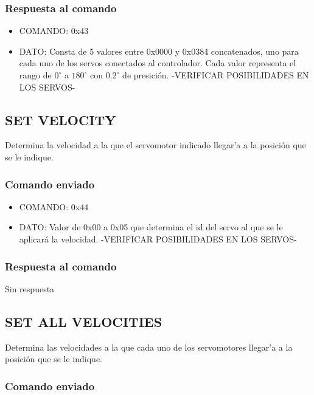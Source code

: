 \documentclass[a4paper,11pt]{article}
\begin{document}
\subsubsection*{Respuesta al comando}
\label{get_all_position_respuesta}

\begin{itemize}
	\item{COMANDO:} 0x43
	\item{DATO:} Consta de 5 valores entre 0x0000 y 0x0384 concatenados, uno para cada uno de los servos conectados al controlador.
	Cada valor representa el rango de $0^{\circ}$ a $180^{\circ}$ con $0.2^{\circ}$ de presici\'on. -VERIFICAR POSIBILIDADES EN LOS SERVOS-
\end{itemize}

\subsection{SET VELOCITY}
\label{set_velocity}

Determina la velocidad a la que el servomotor indicado llegar'a a la posici\'on que se le indique.

\subsubsection*{Comando enviado}
\label{set_velocity_comando_enviado}

\begin{itemize}
	\item{COMANDO:} 0x44
	\item{DATO:} Valor de 0x00 a 0x05 que determina el id del servo al que se le aplicar\'a la velocidad.
	-VERIFICAR POSIBILIDADES EN LOS SERVOS-
\end{itemize}

\subsubsection*{Respuesta al comando}
\label{set_velocity_respuesta}

Sin respuesta

\subsection{SET ALL VELOCITIES}
\label{set_all_velocities}

Determina las velocidades a la que cada uno de los servomotores llegar'a a la posici\'on que se le indique.

\subsubsection*{Comando enviado}
\label{set_all_velocities_comando_enviado}
\end{document}
